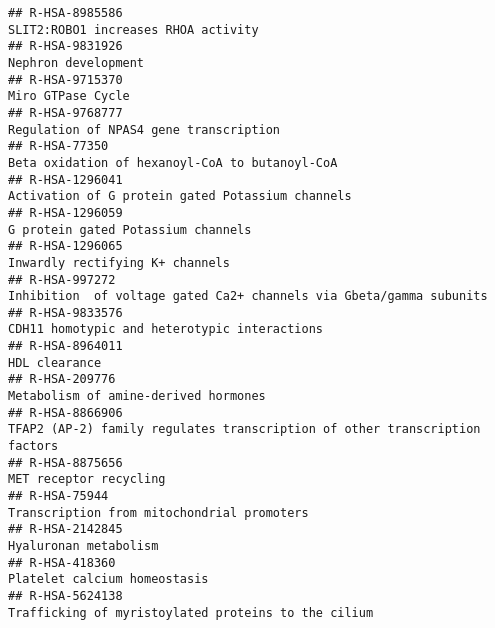 \documentclass[
]{article}
\begin{document}
\begin{verbatim}
## R-HSA-8985586                                                                                                  SLIT2:ROBO1 increases RHOA activity
## R-HSA-9831926                                                                                                                  Nephron development
## R-HSA-9715370                                                                                                                    Miro GTPase Cycle
## R-HSA-9768777                                                                                               Regulation of NPAS4 gene transcription
## R-HSA-77350                                                                                         Beta oxidation of hexanoyl-CoA to butanoyl-CoA
## R-HSA-1296041                                                                                     Activation of G protein gated Potassium channels
## R-HSA-1296059                                                                                                   G protein gated Potassium channels
## R-HSA-1296065                                                                                                      Inwardly rectifying K+ channels
## R-HSA-997272                                                                   Inhibition  of voltage gated Ca2+ channels via Gbeta/gamma subunits
## R-HSA-9833576                                                                                         CDH11 homotypic and heterotypic interactions
## R-HSA-8964011                                                                                                                        HDL clearance
## R-HSA-209776                                                                                                  Metabolism of amine-derived hormones
## R-HSA-8866906                                                           TFAP2 (AP-2) family regulates transcription of other transcription factors
## R-HSA-8875656                                                                                                               MET receptor recycling
## R-HSA-75944                                                                                             Transcription from mitochondrial promoters
## R-HSA-2142845                                                                                                                Hyaluronan metabolism
## R-HSA-418360                                                                                                          Platelet calcium homeostasis
## R-HSA-5624138                                                                                  Trafficking of myristoylated proteins to the cilium

\end{verbatim}
\end{document}
